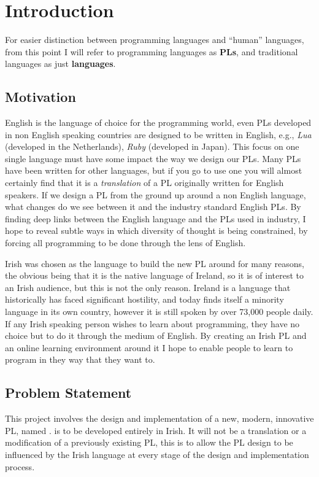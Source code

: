 \chapter{Introduction}
For easier distinction between programming languages and ``human'' languages, from this point I will refer to programming languages as \textbf{PLs}, and traditional languages as just \textbf{languages}.

\section{Motivation}
English is the language of choice for the programming world, even PLs developed in non English speaking countries are designed to be written in English, e.g., \emph{Lua} (developed in the Netherlands), \emph{Ruby} (developed in Japan). This focus on one single language must have some impact the way we design our PLs. Many PLs have been written for other languages, but if you go to use one you will almost certainly find that it is a \emph{translation} of a PL originally written for English speakers\cite{wikipllist}. If we design a PL from the ground up around a non English language, what changes do we see between it and the industry standard English PLs. By finding deep links between the English language and the PLs used in industry, I hope to reveal subtle ways in which diversity of thought is being constrained, by forcing all programming to be done through the lens of English.

Irish was chosen as the language to build the new PL around for many reasons, the obvious being that it is the native language of Ireland, so it is of interest to an Irish audience, but this is not the only reason. Ireland is a language that historically has faced significant hostility, and today finds itself a minority language in its own country, however it is still spoken by over 73,000 people daily\cite{csoirish}. If any Irish speaking person wishes to learn about programming, they have no choice but to do it through the medium of English. By creating an Irish PL and an online learning environment around it I hope to enable people to learn to program in they way that they want to.

\section{Problem Statement}
This project involves the design and implementation of a new, modern, innovative PL, named \Setanta{}. \Setanta{} is to be developed entirely in Irish. It will not be a translation or a modification of a previously existing PL, this is to allow the PL design to be influenced by the Irish language at every stage of the design and implementation process.

